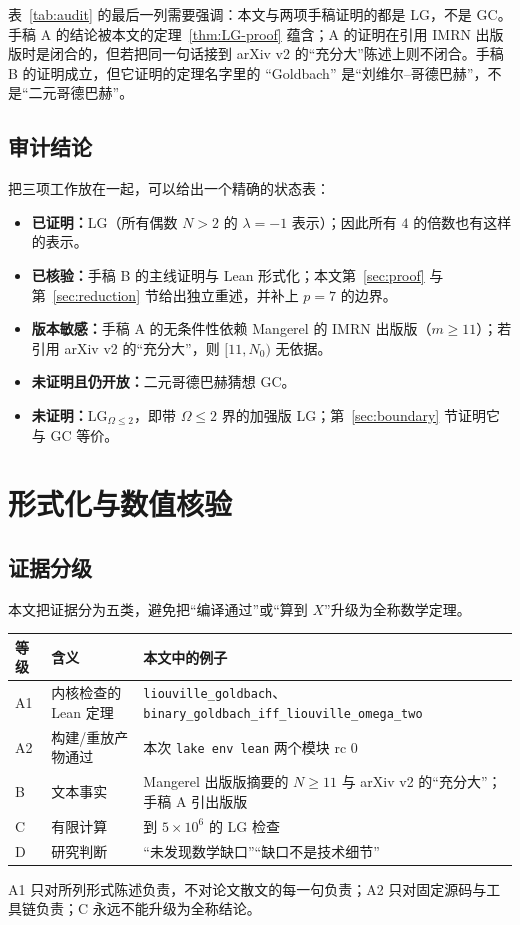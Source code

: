 \documentclass[11pt,a4paper]{ctexart}
\theoremstyle{plain}
\theoremstyle{definition}
\newcommand{\li}{\lambda}
\newcommand{\Om}{\Omega}
\newcommand{\LGtwo}{\mathrm{LG}_{\Om\le2}}
\newcommand{\code}[1]{\texttt{#1}}
\begin{document}
表~\ref{tab:audit} 的最后一列需要强调：本文与两项手稿证明的都是 LG，不是 GC。手稿 A 的结论被本文的定理~\ref{thm:LG-proof} 蕴含；A 的证明在引用 IMRN 出版版时是闭合的，但若把同一句话接到 arXiv v2 的“充分大”陈述上则不闭合。手稿 B 的证明成立，但它证明的定理名字里的 “Goldbach” 是“刘维尔--哥德巴赫”，不是“二元哥德巴赫”。

\subsection{审计结论}
\label{sec:audit-conclusion}

把三项工作放在一起，可以给出一个精确的状态表：
\begin{itemize}
\item \textbf{已证明：}LG（所有偶数 $N>2$ 的 $\li=-1$ 表示）；因此所有 $4$ 的倍数也有这样的表示。
\item \textbf{已核验：}手稿 B 的主线证明与 Lean 形式化；本文第~\ref{sec:proof} 与第~\ref{sec:reduction} 节给出独立重述，并补上 $p=7$ 的边界。
\item \textbf{版本敏感：}手稿 A 的无条件性依赖 Mangerel 的 IMRN 出版版（$m\ge11$）；若引用 arXiv v2 的“充分大”，则 $[11,N_0)$ 无依据。
\item \textbf{未证明且仍开放：}二元哥德巴赫猜想 GC。
\item \textbf{未证明：}$\LGtwo$，即带 $\Om\le2$ 界的加强版 LG；第~\ref{sec:boundary} 节证明它与 GC 等价。
\end{itemize}

\section{形式化与数值核验}
\label{sec:verification}

\subsection{证据分级}
\label{sec:evidence}

本文把证据分为五类，避免把“编译通过”或“算到 $X$”升级为全称数学定理。
\begin{center}
\footnotesize
\setlength{\tabcolsep}{3pt}
\begin{tabular}{@{}p{1.6cm}p{6.2cm}p{6.6cm}@{}}
\toprule
等级 & 含义 & 本文中的例子 \\
\midrule
A1 & 内核检查的 Lean 定理 & \code{liouville\_goldbach}、\code{binary\_goldbach\_iff\_}\allowbreak\code{liouville\_omega\_two} \\
A2 & 构建/重放产物通过 & 本次 \code{lake env lean} 两个模块 rc 0 \\
B & 文本事实 & Mangerel 出版版摘要的 $N\ge11$ 与 arXiv v2 的“充分大”；手稿 A 引出版版 \\
C & 有限计算 & 到 $5\times10^6$ 的 LG 检查 \\
D & 研究判断 & “未发现数学缺口”“缺口不是技术细节” \\
\bottomrule
\end{tabular}
\end{center}
A1 只对所列形式陈述负责，不对论文散文的每一句负责；A2 只对固定源码与工具链负责；C 永远不能升级为全称结论。
\end{document}
